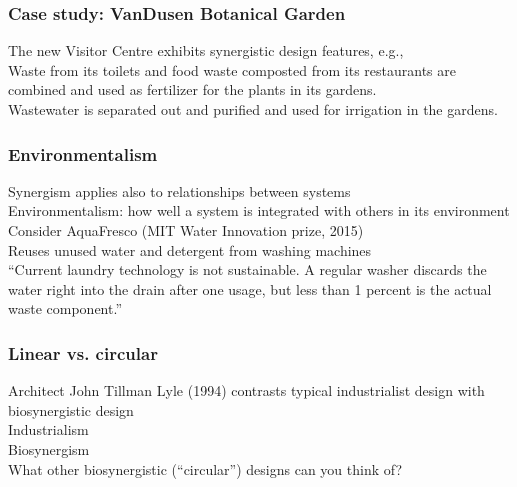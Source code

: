 \documentclass{article}
\begin{document}
\subsubsection*{Case study: VanDusen Botanical Garden}
\label{ssub:case_study_vandusen_botanical_garden}
The new Visitor Centre exhibits synergistic design features, e.g.,\\
Waste from its toilets and food waste composted from its restaurants are combined and used as fertilizer for the plants in its gardens.\\
Wastewater is separated out and purified and used for irrigation in the gardens.\\
\subsubsection*{Environmentalism}
\label{ssub:environmentalism}
Synergism applies also to relationships between systems\\
Environmentalism: how well a system is integrated with others in its environment\\
Consider AquaFresco (MIT Water Innovation prize, 2015)\\
Reuses unused water and detergent from washing machines\\
“Current laundry technology is not sustainable. A regular washer discards the water right into the drain after one usage, but less than 1 percent is the actual waste component.”\\
\subsubsection*{Linear vs. circular}
\label{ssub:linear_vs_circular}
Architect John Tillman Lyle (1994) contrasts typical industrialist design with biosynergistic design\\
Industrialism\\
Biosynergism\\
What other biosynergistic (“circular”) designs can you think of?\\
\end{document}

